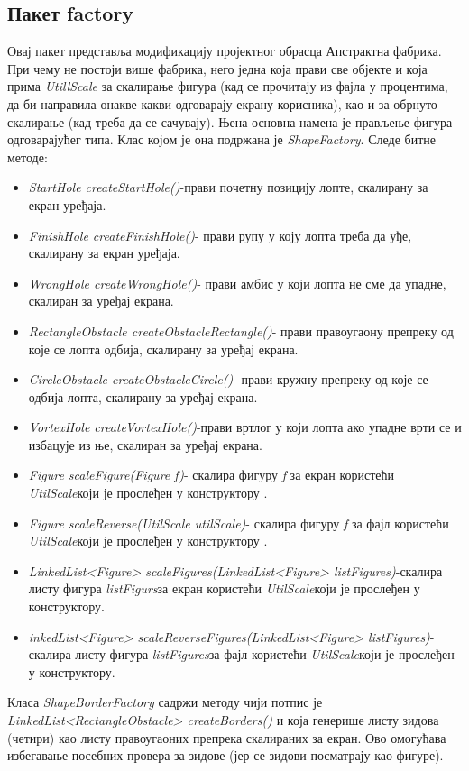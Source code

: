 \subsection{Пакет factory}
Овај пакет представља модификацију пројектног обрасца Апстрактна фабрика. При чему не постоји више фабрика, него једна која прави све објекте и која прима \emph{UtillScale} за скалирање фигура (кад се прочитају из фајла у процентима, да би направила онакве какви одговарају екрану корисника), као и за обрнуто скалирање (кад треба да се сачувају). Њена основна намена је прављење фигура одговарајућег типа. Клас којом је она подржана је \emph{ShapeFactory}. Следе битне методе:
\begin{itemize}
\item \emph{StartHole createStartHole()}-прави почетну позицију лопте, скалирану за екран уређаја.
\item \emph{FinishHole createFinishHole()}- прави рупу у коју лопта треба да уђе, скалирану за екран уређаја.
\item \emph{WrongHole createWrongHole()}- прави амбис у који лопта не сме да упадне, скалиран за уређај екрана.
\item \emph{RectangleObstacle createObstacleRectangle()}- прави правоугаону препреку од које се лопта одбија, скалирану за уређај екрана.
\item \emph{CircleObstacle createObstacleCircle()}- прави кружну препреку од које се одбија лопта, скалирану за уређај екрана.
\item \emph{VortexHole createVortexHole()}-прави вртлог у који лопта ако упадне врти се и избацује из ње, скалиран за уређај екрана.
\item \emph{Figure scaleFigure(Figure f)}- скалира фигуру \emph{f} за екран користећи \emph{UtilScale}који је прослеђен у конструктору .
\item \emph{Figure scaleReverse(UtilScale utilScale)}- скалира фигуру \emph{f} за фајл користећи \emph{UtilScale}који је прослеђен у конструктору .
\item \emph{LinkedList<Figure> scaleFigures(LinkedList<Figure> listFigures)}-скалира листу фигура \emph{listFigurs}за екран користећи \emph{UtilScale}који је прослеђен у конструктору.
\item \emph{inkedList<Figure> scaleReverseFigures(LinkedList<Figure> listFigures)}-скалира листу фигура \emph{listFigures}за фајл користећи \emph{UtilScale}који је прослеђен у конструктору.
\end{itemize}
Класа \emph{ShapeBorderFactory} садржи методу чији потпис је \\\emph{LinkedList<RectangleObstacle> createBorders()} и која генерише листу зидова (четири) као листу правоугаоних препрека скалираних за екран. Ово омогућава избегавање посебних провера за зидове (јер се зидови посматрају као фигуре).

